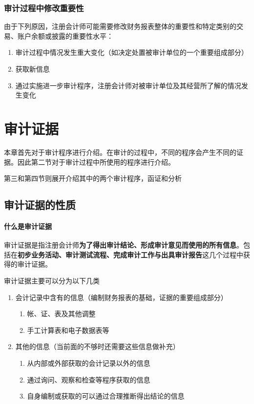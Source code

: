 \documentclass[UTF8,12pt]{ctexart}
\numberwithin{equation}{section} %
\numberwithin{figure}{section}
\numberwithin{table}{section}
\begin{document}
	
	\subsubsection{审计过程中修改重要性}
	由于下列原因，注册会计师可能需要修改财务报表整体的重要性和特定类别的交易、账户余额或披露的重要性水平：
	\begin{enumerate}
		\item 审计过程中情况发生重大变化（如决定处置被审计单位的一个重要组成部分）
		
		\item 获取新信息
		
		\item 通过实施进一步审计程序，注册会计师对被审计单位及其经营所了解的情况发生变化
	\end{enumerate}
	
	
	
	
	
	\newpage
	\section{审计证据}	
	本章首先对于审计程序进行介绍。在审计的过程中，不同的程序会产生不同的证据。因此第二节对于审计过程中所使用的程序进行介绍。
	
	第三和第四节则展开介绍其中的两个审计程序，函证和分析
	
	\subsection{审计证据的性质}
	\paragraph{什么是审计证据}审计证据是指注册会计师\textbf{为了得出审计结论、形成审计意见而使用的所有信息}。包括在\textbf{初步业务活动、审计测试流程、完成审计工作与出具审计报告}这几个过程中获得的审计证据。
	
	审计证据主要可以分为以下几类
	\begin{enumerate}
		\item 会计记录中含有的信息（编制财务报表的基础，证据的重要组成部分）
		\begin{enumerate}
			\item 帐、证、表及其他调整
			
			\item 手工计算表和电子数据表等
		\end{enumerate}
		
		\item 其他的信息（当前面的不够时还需要这些信息做补充）
		\begin{enumerate}
			\item 从内部或外部获取的会计记录以外的信息
			
			\item 通过询问、观察和检查等程序获取的信息
			
			\item 自身编制或获取的可以通过合理推断得出结论的信息
		\end{enumerate}
	\end{enumerate}
	
\end{document}
